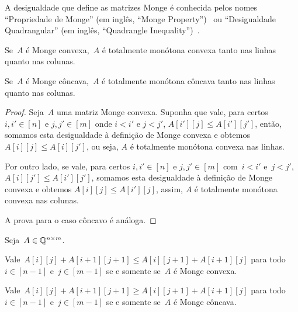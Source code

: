 A desigualdade que define as matrizes Monge é conhecida pelos nomes ``Propriedade de Monge'' (em inglês, ``Monge Property'')~\cite{Burkard:1996} ou ``Desigualdade Quadrangular'' (em inglês, ``Quadrangle Inequality'')~\cite{Yao:1980,Bein:2009}.

\begin{lema} \label{Monge:MCtoTM}
Se~$A$ é Monge convexa,~$A$ é totalmente monótona convexa tanto nas linhas quanto nas colunas.  

Se~$A$ é Monge côncava,~$A$ é totalmente monótona côncava tanto nas linhas quanto nas colunas.
\end{lema}

\begin{proof}
Seja~$A$ uma matriz Monge convexa. Suponha que vale, para certos $i,i' \in [n]$ e $j,j' \in [m]$ onde $i < i'$ e $j < j'$, $A[i'][j] \leq A[i'][j']$, então, somamos esta desigualdade à definição de Monge convexa e obtemos $A[i][j] \leq A[i][j']$, ou seja, $A$ é totalmente monótona convexa nas linhas.  

Por outro lado, se vale, para certos $i,i' \in [n]$ e $j,j' \in [m]$ com~${i < i'}$ e~${j < j'}$, $A[i][j'] \leq A[i'][j']$, somamos esta desigualdade à definição de Monge convexa e obtemos $A[i][j] \leq A[i'][j]$, assim, $A$ é totalmente monótona convexa nas colunas.  

A prova para o caso côncavo é análoga.
\end{proof}

\begin{theo} \label{Monge:theo+1}
Seja~$A \in \mathbb{Q}^{n \times m}$.

Vale~${A[i][j] + A[i+1][j+1] \leq A[i][j+1] + A[i+1][j]}$ para todo~${i \in [n-1]}$ e~${j \in [m-1]}$ se e somente se~$A$ é Monge convexa.

Vale~${A[i][j] + A[i+1][j+1] \geq A[i][j+1] + A[i+1][j]}$ para todo~${i \in [n-1]}$ e~${j \in [m-1]}$ se e somente se~$A$ é Monge côncava.
\end{theo}

